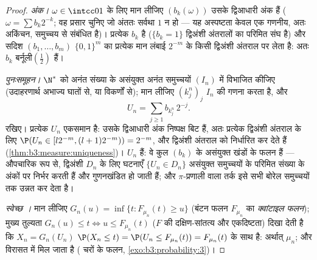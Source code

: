 \begin{proof}
\emph{अंक।} $\omega \in \intcc01$ के लिए मान लीजिए $(b_k(\omega))$ उसके द्विआधारी अंक हैं
($\omega = \sum b_k2^{-k}$; वह प्रसार चुनिए जो अंततः सर्वथा $1$ न हो --- यह अस्पष्टता
केवल एक गणनीय, अतः अकिंचन, समुच्चय से संबंधित है)। प्रत्येक $b_k$
 है ($\{b_k = 1\}$ द्विअंशी अंतरालों का परिमित संघ है) और सदिश
$(b_1, \dots, b_m)$ $\{0,1\}^m$ का प्रत्येक मान लंबाई $2^{-m}$ के किसी द्विअंशी अंतराल पर
लेता है: अतः $b_k$  बर्नूली$(\frac12)$ हैं।

\emph{पुनःसमूहन।} $\N^*$ को अनंत संख्या के असंयुक्त अनंत समुच्चयों
$(I_n)$ में विभाजित कीजिए (उदाहरणार्थ अभाज्य घातों से, या विकर्णों
से); मान लीजिए $(k^n_j)_j$ $I_n$ की गणना करता है, और
\[
U_n = \sum_{j\geq1} b_{k^n_j}\,2^{-j} .
\]
रखिए। प्रत्येक $U_n$ एकसमान है: उसके द्विआधारी अंक  निष्पक्ष
बिट हैं, अतः प्रत्येक द्विअंशी अंतराल के लिए $\P(U_n \in [l2^{-m}, (l+1)2^{-m})) = 2^{-m}$, और द्विअंशी
अंतराल  को निर्धारित कर देते हैं (\cref{thm:b3:measure:uniqueness})। $U_n$ 
हैं: वे  कुल $(b_k)$ के असंयुक्त खंडों के फलन हैं ---
औपचारिक रूप से, द्विअंशी $D_n$ के लिए घटनाएँ $\{U_n \in D_n\}$ असंयुक्त
समुच्चयों के परिमित संख्या के अंकों पर निर्भर करती हैं और गुणनखंडित
हो जाती हैं; और $\pi$-प्रणाली वाला तर्क इसे सभी बोरेल समुच्चयों तक
उन्नत कर देता है।

\emph{स्वेच्छ ।} मान लीजिए $G_n(u) = \inf\{t : F_{\mu_n}(t)
\geq u\}$ (बंटन फलन $F_{\mu_n}$ का
\emph{क्वांटाइल फलन}); मुख्य तुल्यता $G_n(u) \leq t
\iff u \leq F_{\mu_n}(t)$ ($F$ की दक्षिण-सांतत्य
और एकदिष्टता) दिखा देती है कि $X_n = G_n(U_n)$ $\P(X_n \leq t) = \P(U_n \leq F_{\mu_n}(t)) =
F_{\mu_n}(t)$ के साथ  है: अर्थात्
 $\mu_n$; और  विरासत में मिल जाता है (
चरों के फलन, \cref{exo:b3:probability:3})।
\end{proof}

